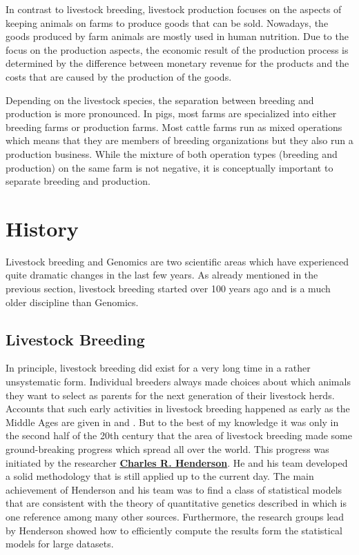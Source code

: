 \documentclass[
]{book}
\begin{document}
In contrast to livestock breeding, livestock production focuses on the aspects of keeping animals on farms to produce goods that can be sold. Nowadays, the goods produced by farm animals are mostly used in human nutrition. Due to the focus on the production aspects, the economic result of the production process is determined by the difference between monetary revenue for the products and the costs that are caused by the production of the goods.

Depending on the livestock species, the separation between breeding and production is more pronounced. In pigs, most farms are specialized into either breeding farms or production farms. Most cattle farms run as mixed operations which means that they are members of breeding organizations but they also run a production business. While the mixture of both operation types (breeding and production) on the same farm is not negative, it is conceptually important to separate breeding and production.

\hypertarget{history}{%
\section{History}\label{history}}

Livestock breeding and Genomics are two scientific areas which have experienced quite dramatic changes in the last few years. As already mentioned in the previous section, livestock breeding started over 100 years ago and is a much older discipline than Genomics.

\hypertarget{livestock-breeding}{%
\subsection{Livestock Breeding}\label{livestock-breeding}}

In principle, livestock breeding did exist for a very long time in a rather unsystematic form. Individual breeders always made choices about which animals they want to select as parents for the next generation of their livestock herds. Accounts that such early activities in livestock breeding happened as early as the Middle Ages are given in \citep{Duerst1931} and \citep{Arndorfer2010}. But to the best of my knowledge it was only in the second half of the 20th century that the area of livestock breeding made some ground-breaking progress which spread all over the world. This progress was initiated by the researcher \href{https://en.wikipedia.org/wiki/Charles_Roy_Henderson}{\textbf{Charles R. Henderson}}. He and his team developed a solid methodology that is still applied up to the current day. The main achievement of Henderson and his team was to find a class of statistical models that are consistent with the theory of quantitative genetics described in \citep{Falconer1996} which is one reference among many other sources. Furthermore, the research groups lead by Henderson showed how to efficiently compute the results form the statistical models for large datasets.
\end{document}
